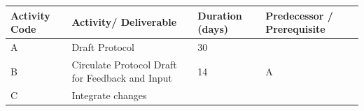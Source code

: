 \documentclass[]{book}
\theoremstyle{definition}
\theoremstyle{definition}
\theoremstyle{definition}
\theoremstyle{remark}
\begin{document}
\begin{longtable}[]{@{}llll@{}}
\toprule
\begin{minipage}[b]{0.20\columnwidth}\raggedright\strut
\textbf{Activity Code}\strut
\end{minipage} & \begin{minipage}[b]{0.30\columnwidth}\raggedright\strut
\textbf{Activity/ Deliverable}\strut
\end{minipage} & \begin{minipage}[b]{0.22\columnwidth}\raggedright\strut
\textbf{Duration (days)}\strut
\end{minipage} & \begin{minipage}[b]{0.17\columnwidth}\raggedright\strut
\textbf{Predecessor / Prerequisite}\strut
\end{minipage}\tabularnewline
\midrule
\endhead
\begin{minipage}[t]{0.20\columnwidth}\raggedright\strut
A\strut
\end{minipage} & \begin{minipage}[t]{0.30\columnwidth}\raggedright\strut
Draft Protocol\strut
\end{minipage} & \begin{minipage}[t]{0.22\columnwidth}\raggedright\strut
30\strut
\end{minipage} & \begin{minipage}[t]{0.17\columnwidth}\raggedright\strut
\strut
\end{minipage}\tabularnewline
\begin{minipage}[t]{0.20\columnwidth}\raggedright\strut
B\strut
\end{minipage} & \begin{minipage}[t]{0.30\columnwidth}\raggedright\strut
Circulate Protocol Draft for Feedback and Input\strut
\end{minipage} & \begin{minipage}[t]{0.22\columnwidth}\raggedright\strut
14\strut
\end{minipage} & \begin{minipage}[t]{0.17\columnwidth}\raggedright\strut
A\strut
\end{minipage}\tabularnewline
\begin{minipage}[t]{0.20\columnwidth}\raggedright\strut
C\strut
\end{minipage} & \begin{minipage}[t]{0.30\columnwidth}\raggedright\strut
Integrate changes\strut
\end{minipage} & \begin{minipage}[t]{0.22\columnwidth}\raggedright\strut

\end{minipage}
\end{longtable}
\end{document}
